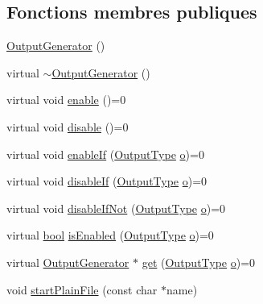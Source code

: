 \subsection*{Fonctions membres publiques}
\begin{DoxyCompactItemize}
\item 
\hyperlink{class_output_generator_a6f6f6c92438ea4e7553e317d5bb17660}{Output\+Generator} ()
\item 
virtual \hyperlink{class_output_generator_acd612f19fca6b44811a3320f9a5044fd}{$\sim$\+Output\+Generator} ()
\item 
virtual void \hyperlink{class_output_generator_a393e80a1e7b5ef29f6b9e1990ba615ce}{enable} ()=0
\item 
virtual void \hyperlink{class_output_generator_a140c11a13a0fbf1c958fac25746a12b7}{disable} ()=0
\item 
virtual void \hyperlink{class_output_generator_a6bd7a39cecc998dd5f743638e835903f}{enable\+If} (\hyperlink{class_output_generator_ab79b5d3c19d95c8a5929c07f5b2918cf}{Output\+Type} \hyperlink{060__command__switch_8tcl_a495e7a4ede0831107e9d435080a7c268}{o})=0
\item 
virtual void \hyperlink{class_output_generator_ac41cafbb9ae5b0d32870984e4fabe651}{disable\+If} (\hyperlink{class_output_generator_ab79b5d3c19d95c8a5929c07f5b2918cf}{Output\+Type} \hyperlink{060__command__switch_8tcl_a495e7a4ede0831107e9d435080a7c268}{o})=0
\item 
virtual void \hyperlink{class_output_generator_ae0d39ce32032866a4394aa5e8942be15}{disable\+If\+Not} (\hyperlink{class_output_generator_ab79b5d3c19d95c8a5929c07f5b2918cf}{Output\+Type} \hyperlink{060__command__switch_8tcl_a495e7a4ede0831107e9d435080a7c268}{o})=0
\item 
virtual \hyperlink{qglobal_8h_a1062901a7428fdd9c7f180f5e01ea056}{bool} \hyperlink{class_output_generator_a802995a552743934a30dd82aae42694b}{is\+Enabled} (\hyperlink{class_output_generator_ab79b5d3c19d95c8a5929c07f5b2918cf}{Output\+Type} \hyperlink{060__command__switch_8tcl_a495e7a4ede0831107e9d435080a7c268}{o})=0
\item 
virtual \hyperlink{class_output_generator}{Output\+Generator} $\ast$ \hyperlink{class_output_generator_ad366efdcaa9df2638110e5ce50efc71d}{get} (\hyperlink{class_output_generator_ab79b5d3c19d95c8a5929c07f5b2918cf}{Output\+Type} \hyperlink{060__command__switch_8tcl_a495e7a4ede0831107e9d435080a7c268}{o})=0
\item 
void \hyperlink{class_output_generator_a719c9ddbba9ba72ec4881c4c61cccf8b}{start\+Plain\+File} (const char $\ast$name)

\end{DoxyCompactItemize}
